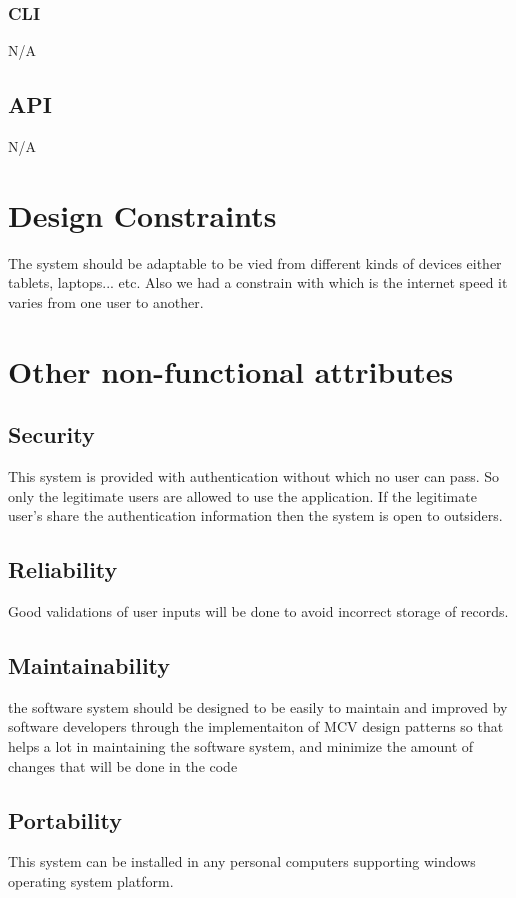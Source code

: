 \documentclass[]{article}
\begin{document}
\subsubsection { CLI}
N/A

\subsection {API}
N/A


\section{Design Constraints}
The system should be adaptable to be vied from different kinds of devices
either tablets, laptops... etc. Also we had a constrain with which is the
internet speed it varies from one user to another. 
\section{Other non-functional attributes}


\subsection {Security}
This system is provided with authentication without which no user can pass. So only the legitimate users are allowed to use the application. If the legitimate user’s share the authentication information then the system is open to outsiders.



\subsection {Reliability}
Good validations of user inputs will be done to avoid incorrect storage of records.
\subsection {Maintainability}

the software system should be designed to be easily to maintain and improved by software developers through the implementaiton of MCV 
design patterns so that helps a lot in maintaining the software system, and minimize the amount of changes that will be done in the code
\subsection {Portability}
This system can be installed in any personal computers supporting windows operating system platform.
\end{document}
